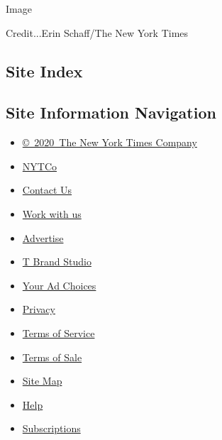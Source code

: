 Image

Credit...Erin Schaff/The New York Times

\hypertarget{site-index}{%
\subsection{Site Index}\label{site-index}}

\hypertarget{site-information-navigation}{%
\subsection{Site Information
Navigation}\label{site-information-navigation}}

\begin{itemize}
\tightlist
\item
  \href{https://help.nytimes.com/hc/en-us/articles/115014792127-Copyright-notice}{©~2020~The
  New York Times Company}
\end{itemize}

\begin{itemize}
\tightlist
\item
  \href{https://www.nytco.com/}{NYTCo}
\item
  \href{https://help.nytimes.com/hc/en-us/articles/115015385887-Contact-Us}{Contact
  Us}
\item
  \href{https://www.nytco.com/careers/}{Work with us}
\item
  \href{https://nytmediakit.com/}{Advertise}
\item
  \href{http://www.tbrandstudio.com/}{T Brand Studio}
\item
  \href{https://www.nytimes.com/privacy/cookie-policy\#how-do-i-manage-trackers}{Your
  Ad Choices}
\item
  \href{https://www.nytimes.com/privacy}{Privacy}
\item
  \href{https://help.nytimes.com/hc/en-us/articles/115014893428-Terms-of-service}{Terms
  of Service}
\item
  \href{https://help.nytimes.com/hc/en-us/articles/115014893968-Terms-of-sale}{Terms
  of Sale}
\item
  \href{https://spiderbites.nytimes.com}{Site Map}
\item
  \href{https://help.nytimes.com/hc/en-us}{Help}
\item
  \href{https://www.nytimes.com/subscription?campaignId=37WXW}{Subscriptions}
\end{itemize}
